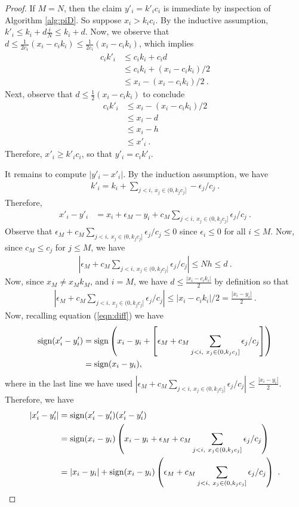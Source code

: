 \documentclass[12pt]{colt2018} %
\begin{document}
\begin{proof}
If $M=N$, then the claim $y'_i=k'_ic_i$ is immediate by inspection of Algorithm \ref{alg:piD}. So suppose $x_i>k_ic_i$. By the inductive assumption, $k'_i\le k_i + d\frac{i}{N}\le k_i+d$. Now, we observe that $d\le \frac{1}{2c_1}(x_i-c_ik_i)\le \frac{1}{2c_i}(x_i-c_ik_i)$, which implies
\begin{align*}
c_ik'_i&\le c_ik_i + c_i d\\
&\le c_ik_i + (x_i-c_ik_i)/2\\
&\le x_i-(x_i-c_ik_i)/2~.
\end{align*}
Next, observe that $d\le \frac{1}{2}(x_i-c_ik_i)$ to conclude
\begin{align*}
c_ik'_i&\le x_i-(x_i-c_ik_i)/2\\
&\le x_i-d\\
&\le x_i-h\\
&\le x'_i~.
\end{align*}
Therefore, $x'_i \ge k'_ic_i$, so that $y'_i=c_ik'_i$.

It remains to compute $|y'_i-x'_i|$. By the induction assumption, we have 
\begin{align*}
k'_i=k_i+\sum_{j< i,\ x_j\in(0,k_jc_j]} -\epsilon_j/c_j~.
\end{align*}
Therefore, 
\begin{align}
x'_i-y'_i&=x_i+\epsilon_M-y_i +c_M\sum_{j< i,\ x_j\in(0,k_jc_j]}\epsilon_j/c_j~.\label{eqn:diff}
\end{align}
Observe that $\epsilon_M+c_M\sum_{j< i,\ x_j\in(0,k_jc_j]}\epsilon_j/c_j\le  0$ since $\epsilon_i\le 0$ for all $i\le M$. Now, since $c_M\le c_j$ for $j\le M$, we have
\begin{align*}
\left|\epsilon_M+c_M\sum_{j< i,\ x_j\in(0,k_jc_j]}\epsilon_j/c_j\right|\le Nh\le d~.
\end{align*}
Now, since $x_M\ne x_Mk_M$, and $i=M$, we have $d\le \frac{|x_i-c_ik_i|}{2}$ by definition so that 
\begin{align*}
\left|\epsilon_M+c_M\sum_{j< i,\ x_j\in(0,k_jc_j]}\epsilon_j/c_j\right|\le |x_i-c_ik_i|/2
=\frac{|x_i-y_i|}{2}~.
\end{align*} 
Now, recalling equation (\ref{eqn:diff}) we have
\begin{align*}
\sign(x'_i-y'_i)&=\sign\left(x_i-y_i +\left[\epsilon_M+c_M\sum_{j< i,\ x_j\in(0,k_jc_j]}\epsilon_j/c_j\right]\right)\\
&=\sign(x_i-y_i),
\end{align*}
where in the last line we have used $\left|\epsilon_M+c_M\sum_{j< i,\ x_j\in(0,k_jc_j]}\epsilon_j/c_j\right|\le \frac{|x_i-y_i|}{2}$. Therefore, we have
\begin{align*}
|x'_i-y'_i|&=\sign(x'_i-y'_i)(x'_i-y'_i)\\
&=\sign(x_i-y_i)\left(x_i-y_i + \epsilon_M+c_M\sum_{j< i,\ x_j\in(0,k_jc_j]}\epsilon_j/c_j\right)\\
&=|x_i-y_i| + \sign(x_i-y_i)\left(\epsilon_M+c_M\sum_{j< i,\ x_j\in(0,k_jc_j]}\epsilon_j/c_j\right)~.
\end{align*}


\end{proof}
\end{document}
